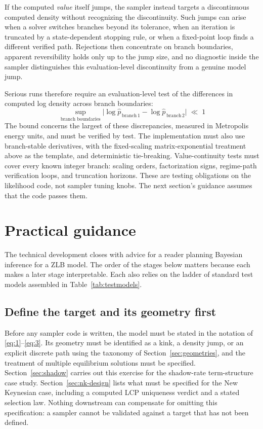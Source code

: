 \documentclass[11pt]{article}
\begin{document}
If the computed \emph{value} itself jumps, the sampler instead targets a discontinuous computed density without recognizing the discontinuity. Such jumps can arise when a solver switches branches beyond its tolerance, when an iteration is truncated by a state-dependent stopping rule, or when a fixed-point loop finds a different verified path. Rejections then concentrate on branch boundaries, apparent reversibility holds only up to the jump size, and no diagnostic inside the sampler distinguishes this evaluation-level discontinuity from a genuine model jump.

Serious runs therefore require an evaluation-level test of the differences in computed log density across branch boundaries:
\begin{equation}\label{eq:98}
 \sup_{\text{branch boundaries}}
 \bigl|\log\widehat p_{\,\text{branch}\,1}-\log\widehat p_{\,\text{branch}\,2}\bigr|
 \;\ll\;1
\end{equation}
The bound concerns the largest of these discrepancies, measured in Metropolis energy units, and must be verified by test. The implementation must also use branch-stable derivatives, with the fixed-scaling matrix-exponential treatment above as the template, and deterministic tie-breaking. Value-continuity tests must cover every known integer branch: scaling orders, factorization signs, regime-path verification loops, and truncation horizons. These are testing obligations on the likelihood code, not sampler tuning knobs. The next section's guidance assumes that the code passes them.

\section{Practical guidance}
\label{sec:guidance}

The technical development closes with advice for a reader planning Bayesian inference for a ZLB model. The order of the stages below matters because each makes a later stage interpretable. Each also relies on the ladder of standard test models assembled in Table~\ref{tab:testmodels}.

\subsection*{Define the target and its geometry first}

Before any sampler code is written, the model must be stated in the notation of \eqref{eq:1}--\eqref{eq:3}. Its geometry must be identified as a kink, a density jump, or an explicit discrete path using the taxonomy of Section~\ref{sec:geometries}, and the treatment of multiple equilibrium solutions must be specified. Section~\ref{sec:shadow} carries out this exercise for the shadow-rate term-structure case study. Section~\ref{sec:nk-design} lists what must be specified for the New Keynesian case, including a computed LCP uniqueness verdict and a stated selection law. Nothing downstream can compensate for omitting this specification: a sampler cannot be validated against a target that has not been defined.
\end{document}
